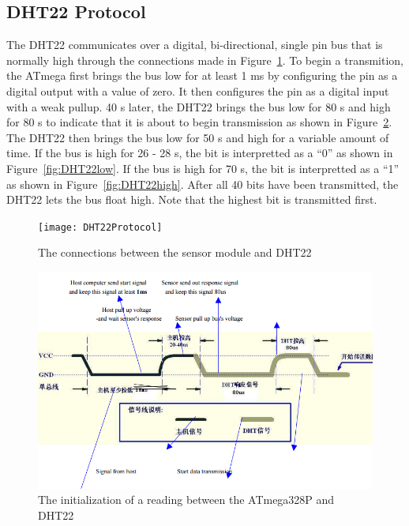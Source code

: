 		\subsection{DHT22 Protocol}
			The DHT22 communicates over a digital, bi-directional, single pin bus that is normally high through the connections made in Figure~\ref{fig:DHT22Protocol}. To begin a transmition, the ATmega first brings the bus low for at least 1 ms by configuring the pin as a digital output with a value of zero. It then configures the pin as a digital input with a weak pullup. 40 \textmu s later, the DHT22 brings the bus low for 80 \textmu s and high for 80 \textmu s to indicate that it is about to begin transmission as shown in Figure~\ref{fig:DHT22init}. The DHT22 then brings the bus low for 50 \textmu s and high for a variable amount of time. If the bus is high for 26 - 28 \textmu s, the bit is interpretted as a ``0'' as shown in Figure~\ref{fig:DHT22low}. If the bus is high for 70 \textmu s, the bit is interpretted as a ``1'' as shown in Figure~\ref{fig:DHT22high}. After all 40 bits have been transmitted, the DHT22 lets the bus float high. Note that the highest bit is transmitted first.
			
			\begin{figure}[h!]
				\centering
				\texttt{[image: DHT22Protocol]}
				\caption{The connections between the sensor module and DHT22}
				\label{fig:DHT22Protocol}
			\end{figure}
			
			\begin{figure}[h!]
				\centering
				\includegraphics[width=\textwidth, angle=0]{DHT22init}
				\caption{The initialization of a reading between the ATmega328P and DHT22}
				\label{fig:DHT22init}
			\end{figure}
			

